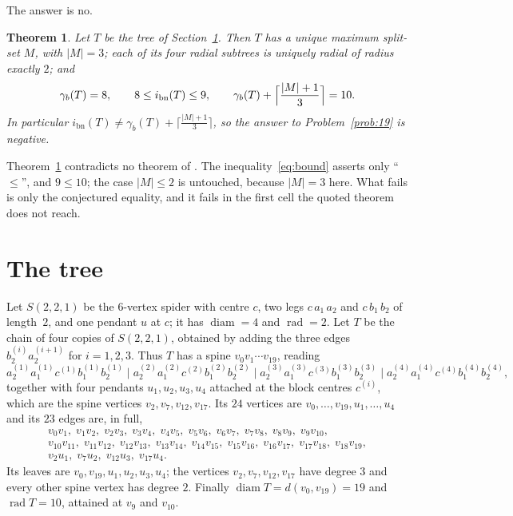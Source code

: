 \documentclass[11pt]{amsart}
\newtheorem{theorem}{Theorem}
\theoremstyle{definition}
\DeclareMathOperator{\diam}{diam}
\DeclareMathOperator{\rad}{rad}
\newcommand{\ibn}{i_{\mathrm{bn}}}
\newcommand{\gb}{\gamma_{b}}
\begin{document}
The answer is no.

\begin{theorem}\label{thm:main}
Let $T$ be the tree of Section~\ref{sec:object}. Then $T$ has a unique maximum
split-set $M$, with $|M|=3$; each of its four radial subtrees is uniquely radial
of radius exactly $2$; and
\[
  \gb(T)=8,\qquad 8\le\ibn(T)\le 9,\qquad
  \gb(T)+\Bigl\lceil\frac{|M|+1}{3}\Bigr\rceil=10 .
\]
In particular $\ibn(T)\ne\gb(T)+\bigl\lceil\frac{|M|+1}{3}\bigr\rceil$, so the
answer to Problem~\ref{prob:19} is negative.
\end{theorem}

Theorem~\ref{thm:main} contradicts no theorem of \cite{MM2024}. The
inequality~\eqref{eq:bound} asserts only ``$\le$'', and $9\le 10$; the case
$|M|\le 2$ is untouched, because $|M|=3$ here. What fails is only the
conjectured equality, and it fails in the first cell the quoted theorem does not
reach.

\section{The tree}\label{sec:object}

Let $S(2,2,1)$ be the $6$-vertex spider with centre $c$, two legs $c\,a_1\,a_2$
and $c\,b_1\,b_2$ of length~$2$, and one pendant $u$ at $c$; it has $\diam=4$
and $\rad=2$. Let $T$ be the chain of four copies of $S(2,2,1)$, obtained by
adding the three edges $b_2^{(i)}a_2^{(i+1)}$ for $i=1,2,3$. Thus $T$ has a
spine $v_0v_1\cdots v_{19}$, reading
\[
  a_2^{(1)}a_1^{(1)}c^{(1)}b_1^{(1)}b_2^{(1)}\;\bigl|\;
  a_2^{(2)}a_1^{(2)}c^{(2)}b_1^{(2)}b_2^{(2)}\;\bigl|\;
  a_2^{(3)}a_1^{(3)}c^{(3)}b_1^{(3)}b_2^{(3)}\;\bigl|\;
  a_2^{(4)}a_1^{(4)}c^{(4)}b_1^{(4)}b_2^{(4)},
\]
together with four pendants $u_1,u_2,u_3,u_4$ attached at the block centres
$c^{(i)}$, which are the spine vertices $v_2,v_7,v_{12},v_{17}$. Its $24$
vertices are $v_0,\dots,v_{19},u_1,\dots,u_4$ and its $23$ edges are, in full,
\begin{equation}\label{eq:edges}
\begin{gathered}
  v_0v_1,\;v_1v_2,\;v_2v_3,\;v_3v_4,\;v_4v_5,\;v_5v_6,\;v_6v_7,\;v_7v_8,\;
  v_8v_9,\;v_9v_{10},\\
  v_{10}v_{11},\;v_{11}v_{12},\;v_{12}v_{13},\;v_{13}v_{14},\;v_{14}v_{15},\;
  v_{15}v_{16},\;v_{16}v_{17},\;v_{17}v_{18},\;v_{18}v_{19},\\
  v_2u_1,\;v_7u_2,\;v_{12}u_3,\;v_{17}u_4 .
\end{gathered}
\end{equation}
Its leaves are $v_0,v_{19},u_1,u_2,u_3,u_4$; the vertices
$v_2,v_7,v_{12},v_{17}$ have degree $3$ and every other spine vertex has degree
$2$. Finally $\diam T=d(v_0,v_{19})=19$ and $\rad T=10$, attained at $v_9$ and
$v_{10}$.
\end{document}
